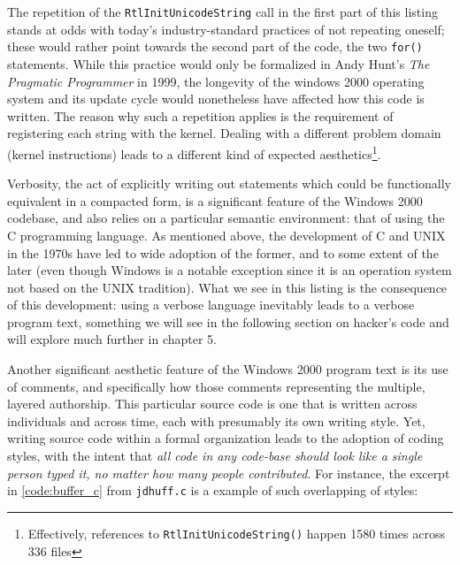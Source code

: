 The repetition of the \lstinline{RtlInitUnicodeString} call in the first part of this listing stands at odds with today's industry-standard practices of not repeating oneself; these would rather point towards the second part of the code, the two \lstinline{for()} statements. While this practice would only be formalized in Andy Hunt's \emph{The Pragmatic Programmer} in 1999\cite{hunt_pragmatic_1999}, the longevity of the windows 2000 operating system and its update cycle would nonetheless have affected how this code is written. The reason why such a repetition applies is the requirement of registering each string with the kernel. Dealing with a different problem domain (kernel instructions) leads to a different kind of expected aesthetics\footnote{Effectively, references to \lstinline{RtlInitUnicodeString()} happen 1580 times across 336 files}.

Verbosity, the act of explicitly writing out statements which could be functionally equivalent in a compacted form,  is a significant feature of the Windows 2000 codebase, and also relies on a particular semantic environment: that of using the C programming language. As mentioned above, the development of C and UNIX in the 1970s have led to wide adoption of the former, and to some extent of the later (even though Windows is a notable exception since it is an operation system not based on the UNIX tradition). What we see in this listing is the consequence of this development: using a verbose language inevitably leads to a verbose program text, something we will see in the following section on hacker's code and will explore much further in chapter 5.

Another significant aesthetic feature of the Windows 2000 program text is its use of comments, and specifically how those comments representing the multiple, layered authorship. This particular source code is one that is written across individuals and across time, each with presumably its own writing style. Yet, writing source code within a formal organization leads to the adoption of coding styles, with the intent that \emph{all code in any code-base should look like a single person typed it, no matter how many people contributed}\cite{waldron_idiomatic_2020}. For instance, the excerpt in \ref{code:buffer_c} from \lstinline{jdhuff.c} is a example of such overlapping of styles:

